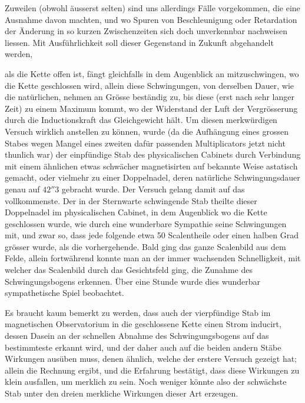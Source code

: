 \expandafter\def\csname HistoricalNoteText550\endcsname{Zuweilen (obwohl äusserst selten) sind uns allerdings Fälle vorgekommen, die eine Ausnahme davon machten, und wo Spuren von Beschleunigung oder Retardation der Änderung in so kurzen Zwischenzeiten sich doch unverkennbar nachweisen liessen. Mit Ausführlichkeit soll dieser Gegenstand in Zukunft abgehandelt werden,}
\expandafter\def\csname HistoricalNoteText544\endcsname{\enspace{}}
\par\clearpage
{}
\noindent als die Kette offen ist, fängt gleichfalls in dem Augenblick an mitzuschwingen, wo die Kette geschlossen wird, allein diese Schwingungen, von derselben Dauer, wie die natürlichen, nehmen an Grösse beständig zu, bis diese (erst nach sehr langer Zeit) zu einem Maximum kommt, wo der Widerstand der Luft der Vergrösserung durch die Inductionskraft das Gleichgewicht hält. Um diesen merkwürdigen Versuch wirklich anstellen zu können, wurde (da die Aufhängung eines grossen Stabes wegen Mangel eines zweiten dafür passenden Multiplicators jetzt nicht thunlich war) der einpfündige Stab des physicalischen Cabinets durch Verbindung mit einem ähnlichen etwas schwächer magnetisirten auf bekannte Weise astatisch gemacht, oder vielmehr zu einer Doppelnadel, deren natürliche Schwingungsdauer genau auf $42''3$ gebracht wurde. Der Versuch gelang damit auf das vollkommenste. Der in der Sternwarte schwingende Stab theilte dieser Doppelnadel im physicalischen Cabinet, in dem Augenblick wo die Kette geschlossen wurde, wie durch eine wunderbare Sympathie seine Schwingungen mit, und zwar so, dass jede folgende etwa 50 Scalentheile oder einen halben Grad grösser wurde, als die vorhergehende. Bald ging das ganze Scalenbild aus dem Felde, allein fortwährend konnte man an der immer wachsenden Schnelligkeit, mit welcher das Scalenbild durch das Gesichtsfeld ging, die Zunahme des Schwingungsbogens erkennen. Über eine Stunde wurde dies wunderbar sympathetische Spiel beobachtet.

Es braucht kaum bemerkt zu werden, dass auch der vierpfündige Stab im magnetischen Observatorium in die geschlossene Kette einen Strom inducirt, dessen Dasein an der schnellen Abnahme des Schwingungsbogens auf das bestimmteste erkannt wird, und der daher auch auf die beiden andern Stäbe Wirkungen ausüben muss, denen ähnlich, welche der erstere Versuch gezeigt hat; allein die Rechnung ergibt, und die Erfahrung bestätigt, dass diese Wirkungen zu klein ausfallen, um merklich zu sein. Noch weniger könnte also der schwächste Stab unter den dreien merkliche Wirkungen dieser Art erzeugen.


